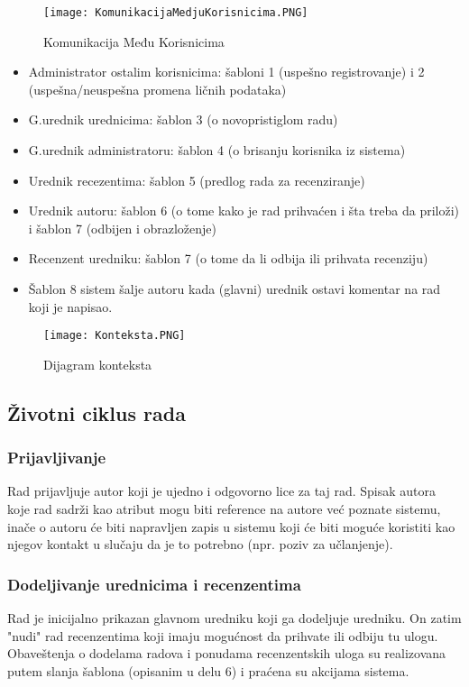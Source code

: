 \documentclass[a4paper]{article}
\begin{document}
\begin{figure}[hbt!]
    \centering
    \texttt{[image: KomunikacijaMedjuKorisnicima.PNG]}
    \caption{Komunikacija Među Korisnicima}
    \label{fig:my_label}
\end{figure}


\begin{itemize}
\item Administrator ostalim korisnicima: šabloni 1 (uspešno registrovanje) i 2 (uspešna/neuspešna promena ličnih podataka)
\item G.urednik urednicima: šablon 3 (o novopristiglom radu)
\item G.urednik administratoru: šablon 4 (o brisanju korisnika iz sistema)
\item Urednik recezentima: šablon 5 (predlog rada za recenziranje)
\item Urednik autoru: šablon 6 (o tome kako je rad prihvaćen i šta treba da priloži) i  šablon 7 (odbijen i obrazloženje)
\item Recenzent uredniku: šablon 7 (o tome da li odbija ili prihvata recenziju)
\item Šablon 8 sistem šalje autoru kada (glavni) urednik ostavi komentar na rad koji je napisao.
\end{itemize}

\begin{figure}[hbt!]
    \centering
    \texttt{[image: Konteksta.PNG]}
    \caption{Dijagram konteksta}
    \label{fig:my_label}
\end{figure}



\subsection{Životni ciklus rada}
\subsubsection{Prijavljivanje}
Rad prijavljuje autor koji je ujedno i odgovorno lice za taj rad. Spisak autora koje rad sadrži kao atribut mogu biti reference na autore već poznate sistemu, inače o autoru će biti napravljen zapis u sistemu koji će biti moguće koristiti kao njegov kontakt u slučaju da je to potrebno (npr. poziv za učlanjenje).
\subsubsection{Dodeljivanje urednicima i recenzentima}
Rad je inicijalno prikazan glavnom uredniku koji ga dodeljuje uredniku. On zatim "nudi" rad recenzentima koji imaju mogućnost da prihvate ili odbiju tu ulogu. Obaveštenja o dodelama radova i ponudama recenzentskih uloga su realizovana putem slanja šablona (opisanim u delu 6) i praćena su akcijama sistema.
\end{document}

